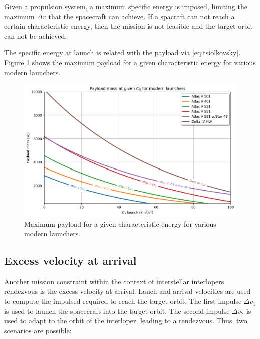 Given a propulsion system, a maximum specific energy is imposed, limiting the
maximum $\Delta v$ that the spacecraft can achieve. If a spacraft can not reach
a certain characteristic energy, then the mission is not feasible and the
target orbit can not be achieved.

The specific energy at launch is related with the payload via
\ref{eq:tsiolkovsky}. Figure \ref{fig:payload_vs_c3} shows the maximum payload for a
given characteristic energy for various modern launchers.

\begin{figure}[H]
  \centering
  \includegraphics[width=\textwidth]{fig/static/payload_vs_c3}
  \caption[Maximum payload for a given characteristic energy for various modern]{Maximum payload for a given characteristic energy for various modern launchers.}
  \label{fig:payload_vs_c3}
\end{figure}

\subsection{Excess velocity at arrival}
\label{sec:excess_velocity}

Another mission constraint within the context of interstellar interlopers rendezvous is the
excess velocity at arrival. Lauch and arrival velocities are used to compute the
impulsed required to reach the target orbit. The first impulse $\Delta v_1$ is
used to launch the spacecraft into the target orbit. The second impulse $\Delta
  v_2$ is used to adapt to the orbit of the interloper, leading to a rendezvous.
Thus, two scenarios are possible:

